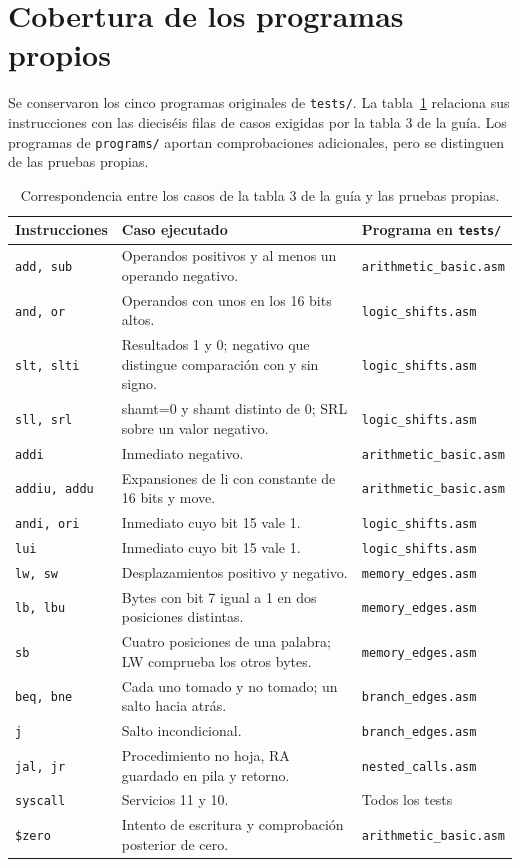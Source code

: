 \documentclass[11pt,a4paper]{article}
\newcommand{\sig}[1]{\texttt{#1}}
\begin{document}
\clearpage
\section{Cobertura de los programas propios}

Se conservaron los cinco programas originales de \sig{tests/}. La
tabla~\ref{tab:cobertura} relaciona sus instrucciones con las dieciséis filas
de casos exigidas por la tabla 3 de la guía. Los programas de \sig{programs/}
aportan comprobaciones adicionales, pero se distinguen de las pruebas propias.

\begin{table}[htbp]
\centering
\small
\caption{Correspondencia entre los casos de la tabla 3 de la guía y las pruebas propias.}
\label{tab:cobertura}
\begin{tabularx}{\linewidth}{@{}p{2.2cm}X p{4.35cm}@{}}
\toprule
Instrucciones & Caso ejecutado & Programa en \texttt{tests/} \\
\midrule
\texttt{add, sub} & Operandos positivos y al menos un operando negativo. & \texttt{arithmetic\_basic.asm} \\
\texttt{and, or} & Operandos con unos en los 16 bits altos. & \texttt{logic\_shifts.asm} \\
\texttt{slt, slti} & Resultados 1 y 0; negativo que distingue comparación con y sin signo. & \texttt{logic\_shifts.asm} \\
\texttt{sll, srl} & shamt=0 y shamt distinto de 0; SRL sobre un valor negativo. & \texttt{logic\_shifts.asm} \\
\texttt{addi} & Inmediato negativo. & \texttt{arithmetic\_basic.asm} \\
\texttt{addiu, addu} & Expansiones de li con constante de 16 bits y move. & \texttt{arithmetic\_basic.asm} \\
\texttt{andi, ori} & Inmediato cuyo bit 15 vale 1. & \texttt{logic\_shifts.asm} \\
\texttt{lui} & Inmediato cuyo bit 15 vale 1. & \texttt{logic\_shifts.asm} \\
\texttt{lw, sw} & Desplazamientos positivo y negativo. & \texttt{memory\_edges.asm} \\
\texttt{lb, lbu} & Bytes con bit 7 igual a 1 en dos posiciones distintas. & \texttt{memory\_edges.asm} \\
\texttt{sb} & Cuatro posiciones de una palabra; LW comprueba los otros bytes. & \texttt{memory\_edges.asm} \\
\texttt{beq, bne} & Cada uno tomado y no tomado; un salto hacia atrás. & \texttt{branch\_edges.asm} \\
\texttt{j} & Salto incondicional. & \texttt{branch\_edges.asm} \\
\texttt{jal, jr} & Procedimiento no hoja, RA guardado en pila y retorno. & \texttt{nested\_calls.asm} \\
\texttt{syscall} & Servicios 11 y 10. & Todos los tests \\
\texttt{\$zero} & Intento de escritura y comprobación posterior de cero. & \texttt{arithmetic\_basic.asm} \\
\bottomrule
\end{tabularx}
\end{table}
\end{document}
